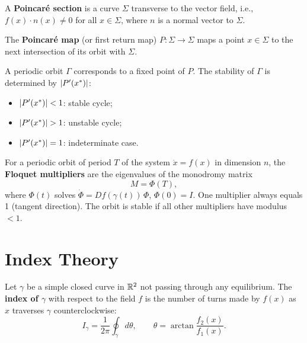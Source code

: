 \begin{definition}
A \textbf{Poincar\'e section} is a curve $\Sigma$ transverse to the vector
field, i.e., $f(x) \cdot n(x) \neq 0$ for all $x \in \Sigma$, where $n$
is a normal vector to $\Sigma$.
\end{definition}

\begin{definition}
The \textbf{Poincar\'e map} (or first return map) $P : \Sigma \to \Sigma$
maps a point $x \in \Sigma$ to the next intersection of its orbit with
$\Sigma$.
\end{definition}

\begin{proposition}
A periodic orbit $\Gamma$ corresponds to a fixed point of $P$. The stability
of $\Gamma$ is determined by $\left| P'(x^*) \right|$:
\begin{itemize}
    \item $\left| P'(x^*) \right| < 1$: stable cycle;
    \item $\left| P'(x^*) \right| > 1$: unstable cycle;
    \item $\left| P'(x^*) \right| = 1$: indeterminate case.
\end{itemize}
\end{proposition}

\begin{definition}
For a periodic orbit of period $T$ of the system $\dot{x} = f(x)$ in
dimension $n$, the \textbf{Floquet multipliers} are the eigenvalues of the
monodromy matrix
\[
    M = \Phi(T),
\]
where $\Phi(t)$ solves $\dot{\Phi} = Df(\gamma(t))\,\Phi$, $\Phi(0) = I$.
One multiplier always equals 1 (tangent direction). The orbit is stable if
all other multipliers have modulus $< 1$.
\end{definition}

\section{Index Theory}

\begin{definition}
Let $\gamma$ be a simple closed curve in $\mathbb{R}^2$ not passing through any
equilibrium. The \textbf{index of $\gamma$} with respect to the field $f$ is
the number of turns made by $f(x)$ as $x$ traverses $\gamma$ counterclockwise:
\[
    I_\gamma = \frac{1}{2\pi}\oint_\gamma d\theta, \qquad
    \theta = \arctan\frac{f_2(x)}{f_1(x)}.
\]
\end{definition}

